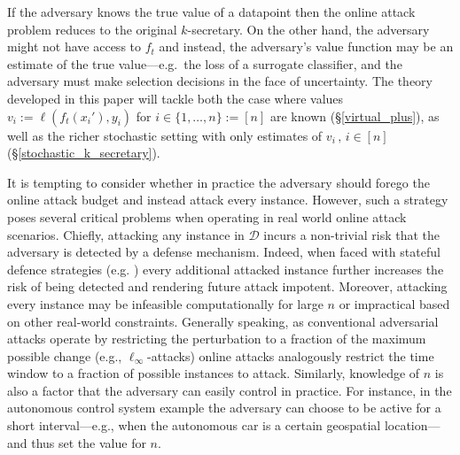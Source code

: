 If the adversary knows the true value of a datapoint then the online attack problem reduces to the original $k$-secretary. On the other hand, the adversary might not have access to $f_t$ and instead, the adversary's value function may be an estimate of the true value---e.g.\ the loss of a surrogate classifier, and the adversary must make selection decisions in the face of uncertainty. The theory developed in this paper will tackle both the case where values $v_i:=\ell(f_t(x_i'),y_i)$ for $i \in \{1,\ldots,n\} :=[n]$ are known (\S\ref{virtual_plus}), as well as the richer stochastic setting with only estimates of $v_i\,,\, i \in [n]$ (\S\ref{stochastic_k_secretary}).


 It is tempting to consider whether in practice the adversary should forego the online attack budget and instead attack every instance. However, such a strategy poses several critical problems when operating in real world online attack scenarios. Chiefly, attacking any instance in $\mathcal{D}$ incurs a non-trivial risk that the adversary is detected by a defense mechanism. Indeed, when faced with stateful defence strategies (e.g. \cite{chen2020stateful}) every additional attacked instance further increases the risk of being detected and rendering future attack impotent. Moreover, attacking every instance may be infeasible computationally for large $n$ or impractical based on other real-world constraints. Generally speaking, as conventional adversarial attacks operate by restricting the perturbation to a fraction of the maximum possible change (e.g., $\ell_{\infty}$-attacks) online attacks analogously restrict the time window to a fraction of possible instances to attack. Similarly, knowledge of $n$ is also a factor that the adversary can easily control in practice. For instance, in the autonomous control system example the adversary can choose to be active for a short interval---e.g., when the autonomous car is a certain geospatial location---and thus set the value for $n$.


